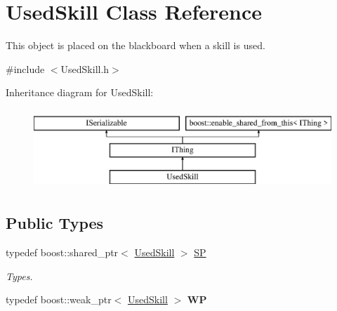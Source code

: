 \hypertarget{class_used_skill}{}\section{Used\+Skill Class Reference}
\label{class_used_skill}


This object is placed on the blackboard when a skill is used.  




{\ttfamily \#include $<$Used\+Skill.\+h$>$}

Inheritance diagram for Used\+Skill\+:\begin{figure}[H]
\begin{center}
\leavevmode
\includegraphics[height=3.000000cm]{class_used_skill}
\end{center}
\end{figure}
\subsection*{Public Types}
\begin{DoxyCompactItemize}
\item 
\mbox{\label{class_used_skill_a9195c4f5e7147fef601ace10dc322369}} 
typedef boost\+::shared\+\_\+ptr$<$ \hyperlink{class_used_skill}{Used\+Skill} $>$ \hyperlink{class_used_skill_a9195c4f5e7147fef601ace10dc322369}{SP}
\begin{DoxyCompactList}\small\item\em Types. \end{DoxyCompactList}\item 
\mbox{\label{class_used_skill_a63ff4b35f90eeca55d7d212c40b53a02}} 
typedef boost\+::weak\+\_\+ptr$<$ \hyperlink{class_used_skill}{Used\+Skill} $>$ {\bfseries WP}
\end{DoxyCompactItemize}
